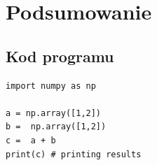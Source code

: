 \documentclass[11pt, a4paper, notitlepage]{report}
\begin{document}
\chapter{Podsumowanie}
\lipsum[2]


\begin{appendices}
\chapter{Kod programu}
\begin{verbatim}
import numpy as np

a = np.array([1,2])
b =  np.array([1,2])
c =  a + b
print(c) # printing results
\end{verbatim}
\end{appendices}
\end{document}
